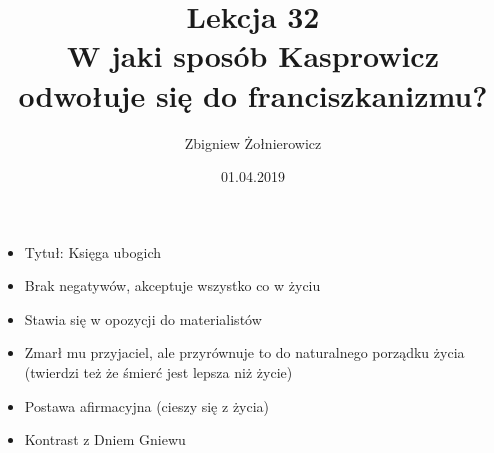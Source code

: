 \documentclass{article}
\begin{document}
\title{
        {\huge Lekcja 32} \\
        {\large W jaki sposób Kasprowicz odwołuje się do franciszkanizmu?}
}
\author{Zbigniew Żołnierowicz}
\date{01.04.2019}
\maketitle
\begin{itemize}
    \item Tytuł: Księga ubogich
    \item Brak negatywów, akceptuje wszystko co w życiu
    \item Stawia się w opozycji do materialistów
    \item Zmarł mu przyjaciel, ale przyrównuje to do naturalnego porządku życia (twierdzi też że śmierć jest lepsza niż życie)
    \item Postawa afirmacyjna (cieszy się z życia)
    \item Kontrast z Dniem Gniewu
\end{itemize}
\end{document}
